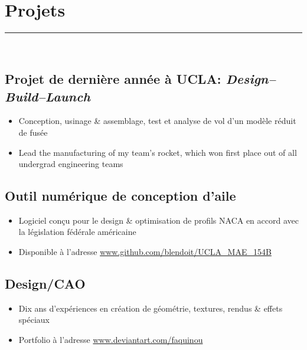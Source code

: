 \documentclass[10pt]{article}
\begin{document}
\section*{Projets}
\rule{\linewidth}{1pt}\\
\subsection*{Projet de dernière année à UCLA: \textit{Design--Build--Launch}}
\begin{itemize}
    \item Conception, usinage \& assemblage, test et analyse de vol d'un modèle réduit de fusée
    \item Lead the manufacturing of my team's rocket, which won first place out of all undergrad engineering teams
\end{itemize}
\subsection*{Outil numérique de conception d'aile}
\begin{itemize}
    \item Logiciel conçu pour le design \& optimisation de profils NACA en accord avec la législation fédérale américaine
    \item  Disponible à l'adresse \url{www.github.com/blendoit/UCLA_MAE_154B}
\end{itemize}
\subsection*{Design/CAO}
\begin{itemize}
    \item Dix ans d'expériences en création de géométrie, textures, rendus \& effets spéciaux
    \item Portfolio à l'adresse \url{www.deviantart.com/faquinou}
\end{itemize}
\end{document}
